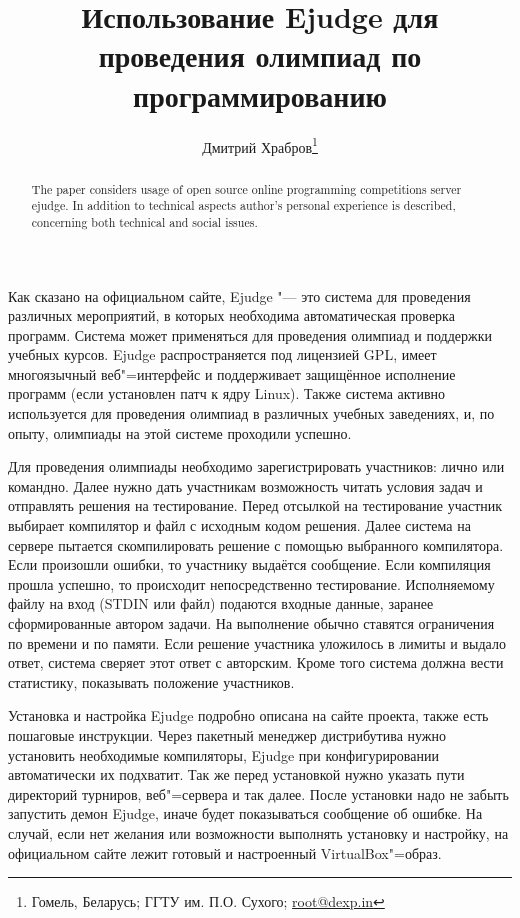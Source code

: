 \documentclass[10pt, a5paper]{article}
\begin{document}
\title{Использование Ejudge для проведения олимпиад по программированию}%

\author{Дмитрий Храбров\footnote{Гомель, Беларусь; ГГТУ им. П.О. Сухого; \url{root@dexp.in}}}
\maketitle

\begin{abstract}
The paper considers usage of open source online programming competitions server ejudge. In addition to technical aspects \linebreak author's personal experience is described, concerning both \linebreak technical and social issues.
\end{abstract}

 Как сказано на официальном сайте, Ejudge "--- это система для проведения различных мероприятий, в которых необходима автоматическая проверка программ. Система может применяться для проведения олимпиад и поддержки учебных курсов. Ejudge распространяется под лицензией GPL, имеет многоязычный веб"=интерфейс и поддерживает защищённое исполнение программ (если установлен патч к ядру Linux). Также система активно используется для проведения олимпиад в различных учебных заведениях, и, по опыту, олимпиады на этой системе проходили успешно.

Для проведения олимпиады необходимо зарегистрировать участников: лично или командно. Далее нужно дать участникам возможность читать условия задач и отправлять решения на тестирование. Перед отсылкой на тестирование участник выбирает компилятор и файл с исходным кодом решения. Далее система на сервере пытается скомпилировать решение с помощью выбранного компилятора. Если произошли ошибки, то участнику выдаётся сообщение. Если компиляция прошла успешно, то происходит непосредственно тестирование. Исполняемому файлу на вход (STDIN или файл) подаются входные данные, заранее сформированные автором задачи. На выполнение обычно ставятся ограничения по времени и по памяти. Если решение участника уложилось в лимиты и выдало ответ, система сверяет этот ответ с авторским. Кроме того система должна вести статистику, показывать положение участников. 

Установка и настройка Ejudge подробно описана на сайте проекта, также есть пошаговые инструкции. Через пакетный менеджер дистрибутива нужно установить необходимые компиляторы, Ejudge при конфигурировании автоматически их подхватит. Так же перед установкой нужно указать пути директорий турниров, веб"=сервера и так далее. После установки надо не забыть запустить демон Ejudge, иначе будет показываться сообщение об ошибке. На случай, если нет желания или возможности выполнять установку и настройку, на официальном сайте лежит готовый и настроенный VirtualBox"=образ.
\end{document}

